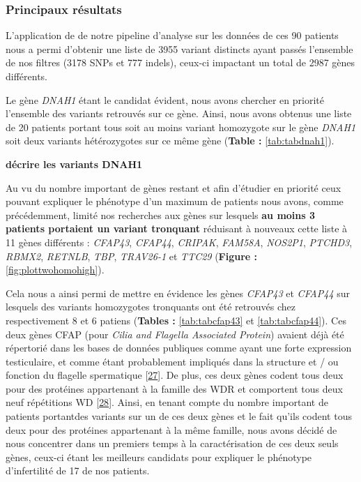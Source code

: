 \documentclass[12pt,twoside]{reedthesis}
\theoremstyle{definition}
\theoremstyle{definition}
\theoremstyle{remark}
\begin{document}
  
  
  \newpage
  
  \subsubsection{Principaux résultats}\label{principaux-resultats-4}
  
  L'application de de notre pipeline d'analyse sur les données de ces 90
  patients nous a permi d'obtenir une liste de 3955 variant distincts
  ayant passés l'ensemble de nos filtres (3178 SNPs et 777 indels),
  ceux-ci impactant un total de 2987 gènes différents.
  
  Le gène \emph{DNAH1} étant le candidat évident, nous avons chercher en
  priorité l'ensemble des variants retrouvés sur ce gène. Ainsi, nous
  avons obtenus une liste de 20 patients portant tous soit au moins
  variant homozygote sur le gène \emph{DNAH1} soit deux variants
  hétérozygotes sur ce même gène (\textbf{Table : }\ref{tab:tabdnah1}).
  
  \textbf{décrire les variants DNAH1}
  
  Au vu du nombre important de gènes restant et afin d'étudier en priorité
  ceux pouvant expliquer le phénotype d'un maximum de patients nous avons,
  comme précédemment, limité nos recherches aux gènes sur lesquels
  \textbf{au moins 3 patients portaient un variant tronquant} réduisant à
  nouveaux cette liste à 11 gènes différents : \emph{CFAP43},
  \emph{CFAP44}, \emph{CRIPAK}, \emph{FAM58A}, \emph{NOS2P1},
  \emph{PTCHD3}, \emph{RBMX2}, \emph{RETNLB}, \emph{TBP}, \emph{TRAV26-1}
  et \emph{TTC29} (\textbf{Figure : }\ref{fig:plottwohomohigh}).
  
  Cela nous a ainsi permi de mettre en évidence les gènes \emph{CFAP43} et
  \emph{CFAP44} sur lesquels des variants homozygotes tronquants ont été
  retrouvés chez respectivement 8 et 6 patiens (\textbf{Tables :
  }\ref{tab:tabcfap43} et \ref{tab:tabcfap44}). Ces deux gènes CFAP (pour
  \emph{Cilia and Flagella Associated Protein}) avaient déjà été
  répertorié dans les bases de données publiques comme ayant une forte
  expression testiculaire, et comme étant probablement impliqués dans la
  structure et / ou fonction du flagelle spermatique
  {[}\protect\hyperlink{ref-Ivliev2012}{27}{]}. De plus, ces deux gènes
  codent tous deux pour des protéines appartenant à la famille des WDR et
  comportent tous deux neuf répétitions WD
  {[}\protect\hyperlink{ref-Smith2008}{28}{]}. Ainsi, en tenant compte du
  nombre important de patients portantdes variants sur un de ces deux
  gènes et le fait qu'ils codent tous deux pour des protéines appartenant
  à la même famille, nous avons décidé de nous concentrer dans un premiers
  temps à la caractérisation de ces deux seuls gènes, ceux-ci étant les
  meilleurs candidats pour expliquer le phénotype d'infertilité de 17 de
  nos patients.
  
\end{document}
